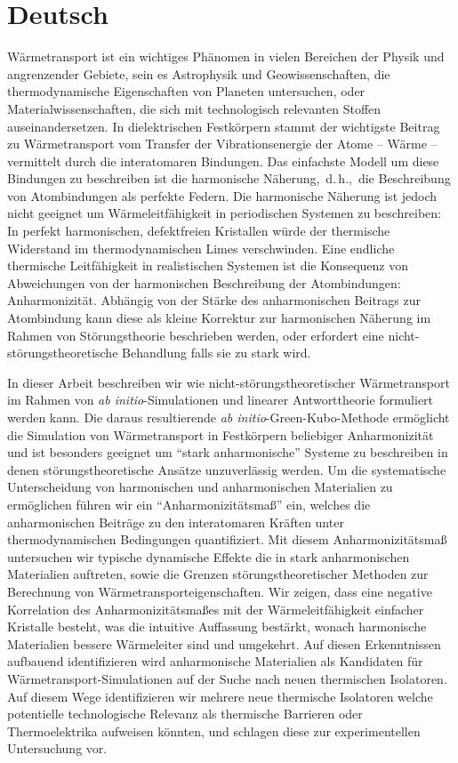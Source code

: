 \section*{Deutsch}

Wärmetransport ist ein wichtiges Phänomen in vielen Bereichen der Physik und angrenzender Gebiete, sein es Astrophysik und Geowissenschaften, die thermodynamische Eigenschaften von Planeten untersuchen, oder Materialwissenschaften, die sich mit technologisch relevanten Stoffen auseinandersetzen. In dielektrischen Festkörpern stammt der wichtigste Beitrag zu Wärmetransport vom Transfer der Vibrationsenergie der Atome -- Wärme -- vermittelt durch die interatomaren Bindungen. Das einfachste Modell um diese Bindungen zu beschreiben ist die harmonische Näherung,~d.\,h.,~die Beschreibung von Atombindungen als perfekte Federn. Die harmonische Näherung ist jedoch nicht geeignet um Wärmeleitfähigkeit in periodischen Systemen zu beschreiben: In perfekt harmonischen, defektfreien Kristallen würde der thermische Widerstand im thermodynamischen Limes verschwinden. Eine endliche thermische Leitfähigkeit in realistischen Systemen ist die Konsequenz von Abweichungen von der harmonischen Beschreibung der Atombindungen: Anharmonizität. Abhängig von der Stärke des anharmonischen Beitrags zur Atombindung kann diese als kleine Korrektur zur harmonischen Näherung im Rahmen von Störungstheorie beschrieben werden, oder erfordert eine nicht-störungstheoretische Behandlung falls sie zu stark wird.

In dieser Arbeit beschreiben wir wie nicht-störungstheoretischer Wärmetransport im Rahmen von \emph{ab initio}-Simulationen und linearer Antworttheorie formuliert werden kann. Die daraus resultierende \emph{ab initio}-Green-Kubo-Methode ermöglicht die Simulation von Wärmetransport in Festkörpern beliebiger Anharmonizität und ist besonders geeignet um ``stark anharmonische'' Systeme zu beschreiben in denen störungstheoretische Ansätze unzuverlässig werden. Um die systematische Unterscheidung von harmonischen und anharmonischen Materialien zu ermöglichen führen wir ein ``Anharmonizitätsmaß'' ein, welches die anharmonischen Beiträge zu den interatomaren Kräften unter thermodynamischen Bedingungen quantifiziert. Mit diesem Anharmonizitätsmaß untersuchen wir typische dynamische Effekte die in stark anharmonischen Materialien auftreten, sowie die Grenzen störungstheoretischer Methoden zur Berechnung von Wärmetransporteigenschaften. Wir zeigen, dass eine negative Korrelation des Anharmonizitätsmaßes mit der Wärmeleitfähigkeit einfacher Kristalle besteht, was die intuitive Auffassung bestärkt, wonach harmonische Materialien bessere Wärmeleiter sind und umgekehrt. Auf diesen Erkenntnissen aufbauend identifizieren wird anharmonische Materialien als Kandidaten für Wärmetransport-Simulationen auf der Suche nach neuen thermischen Isolatoren. Auf diesem Wege identifizieren wir mehrere neue thermische Isolatoren welche potentielle technologische Relevanz als thermische Barrieren oder Thermoelektrika aufweisen könnten, und schlagen diese zur experimentellen Untersuchung vor.

